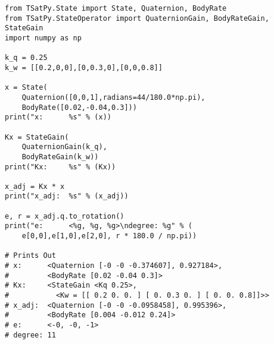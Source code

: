 \begin{singlespace}
  \begin{verbatim}
from TSatPy.State import State, Quaternion, BodyRate
from TSatPy.StateOperator import QuaternionGain, BodyRateGain, StateGain
import numpy as np

k_q = 0.25
k_w = [[0.2,0,0],[0,0.3,0],[0,0,0.8]]

x = State(
    Quaternion([0,0,1],radians=44/180.0*np.pi),
    BodyRate([0.02,-0.04,0.3]))
print("x:      %s" % (x))

Kx = StateGain(
    QuaternionGain(k_q),
    BodyRateGain(k_w))
print("Kx:     %s" % (Kx))

x_adj = Kx * x
print("x_adj:  %s" % (x_adj))

e, r = x_adj.q.to_rotation()
print("e:      <%g, %g, %g>\ndegree: %g" % (
    e[0,0],e[1,0],e[2,0], r * 180.0 / np.pi))

# Prints Out
# x:      <Quaternion [-0 -0 -0.374607], 0.927184>,
#         <BodyRate [0.02 -0.04 0.3]>
# Kx:     <StateGain <Kq 0.25>,
#           <Kw = [[ 0.2 0. 0. ] [ 0. 0.3 0. ] [ 0. 0. 0.8]]>>
# x_adj:  <Quaternion [-0 -0 -0.0958458], 0.995396>,
#         <BodyRate [0.004 -0.012 0.24]>
# e:      <-0, -0, -1>
# degree: 11
  \end{verbatim}
\nocite{minted}
\end{singlespace}
